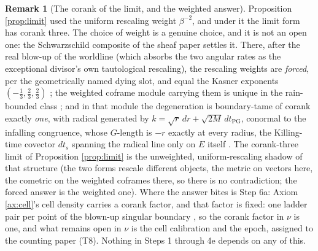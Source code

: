 \documentclass[11pt]{article}
\theoremstyle{definition}
\newtheorem{remark}[theorem]{Remark}
\begin{document}
\begin{remark}[The corank of the limit, and the weighted answer]\label{rem:weights}
Proposition \ref{prop:limit} used the uniform rescaling weight $\beta^{-2}$, and under it the limit form has corank three. The choice of weight is a genuine choice, and it is not an open one: the Schwarzschild composite of the sheaf paper settles it. There, after the real blow-up of the worldline (which absorbs the two angular rates as the exceptional divisor's own tautological rescaling), the rescaling weights are \emph{forced}, per the geometrically named dying slot, and equal the Kasner exponents $(-\tfrac13, \tfrac23, \tfrac23)$ \cite[Thm.~8.16]{ButlerT4}; the weighted coframe module carrying them is unique in the rain-bounded class \cite[Thm.~8.18]{ButlerT4}; and in that module the degeneration is boundary-tame of corank exactly \emph{one}, with radical generated by $k = \sqrt r\,dr + \sqrt{2M}\,dt_{\mathrm{PG}}$, conormal to the infalling congruence, whose $G$-length is $-r$ exactly at every radius, the Killing-time covector $dt_s$ spanning the radical line only on $E$ itself \cite[Thm.~8.7]{ButlerT4}. The corank-three limit of Proposition \ref{prop:limit} is the unweighted, uniform-rescaling shadow of that structure (the two forms rescale different objects, the metric on vectors here, the cometric on the weighted coframes there, so there is no contradiction; the forced answer is the weighted one). Where the answer bites is Step 6a: Axiom \ref{ax:cell}'s cell density carries a corank factor, and that factor is fixed: one ladder pair per point of the blown-up singular boundary \cite[\S 8.9]{ButlerT4}, so the corank factor in $\nu$ is one, and what remains open in $\nu$ is the cell calibration and the epoch, assigned to the counting paper (T8). Nothing in Steps 1 through 4e depends on any of this.
\end{remark}
\end{document}
